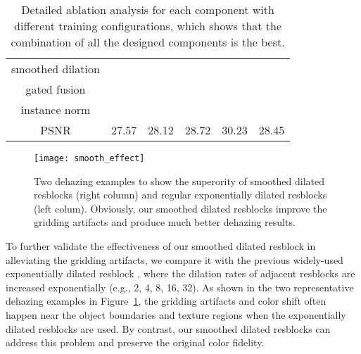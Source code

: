\documentclass[10pt,twocolumn,letterpaper]{article}
\newcommand{\Fref}[1]{Figure~\ref{#1}}
\begin{document}
\setlength{\tabcolsep}{2.8pt}
\renewcommand{\arraystretch}{1.2}
\begin{table}[h]
\begin{center}
\begin{tabular}{cccccc}
\hline
smoothed dilation & &&&   & \\
gated fusion      & &  &&   & \\
instance norm & &   &&  & \\
\hline
PSNR & 27.57 & 28.12  & 28.72 & 30.23 & 28.45 \\
\end{tabular}
\caption{Detailed ablation analysis for each component with different training configurations, which shows that the combination of all the designed components is the best.}

\label{table:ablation}
\end{center}
\end{table}

\begin{figure}[h]
\begin{center}

\texttt{[image: smooth\_effect]}
\end{center}
\caption{Two dehazing examples to  show the superority of smoothed dilated resblocks (right column) and regular exponentially dilated resblocks (left colum). Obviously, our smoothed dilated resblocks improve the gridding artifacts and produce much better dehazing results.}
\label{fg:smooth_effect}
\end{figure}


To further validate the effectiveness of our smoothed dilated resblock in alleviating the gridding artifacts, we compare it with the previous widely-used exponentially dilated resblock \cite{chen2017fast,fan2018decouple,li2018recurrent}, where the dilation rates of adjacent resblocks are increased exponentially (e.g., 2, 4, 8, 16, 32). As shown in the two representative dehazing examples in \Fref{fg:smooth_effect}, the gridding artifacts and color shift often happen near the object boundaries and texture regions when the exponentially dilated resblocks are used. By contrast, our smoothed dilated resblocks can address this problem and preserve the original color fidelity.
\end{document}
